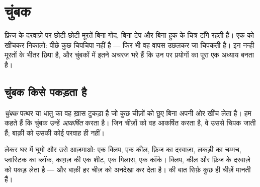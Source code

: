 \chapter{चुंबक}\label{ch:g1:magnets}

फ़्रिज के दरवाज़े पर छोटी-छोटी मूरतें बिना गोंद, बिना टेप और बिना
हुक के चित्र टाँगे रहती हैं। एक को खींचकर निकालो: पीछे कुछ चिपचिपा
नहीं है --- फिर भी वह वापस उछलकर जा चिपकती है। इन नन्ही मूरतों के
भीतर  छिपा है, और चुंबकों में इतने अचरज भरे हैं कि उन पर प्रयोगों
का पूरा एक अध्याय बनता है।

\section{चुंबक किसे पकड़ता है}

\begin{definition}[चुंबक]\label{def:g1:magnets:magnet}
\emph{चुंबक} पत्थर या धातु का वह ख़ास टुकड़ा है जो कुछ
चीज़ों को छुए बिना अपनी ओर खींच लेता है। हम कहते हैं कि चुंबक उन्हें
\emph{आकर्षित} करता है। जिन चीज़ों को वह आकर्षित करता
है, वे उससे चिपक जाती हैं; बाक़ी को उसकी कोई परवाह ही नहीं।
\end{definition}

\begin{example}\label{ex:g1:magnets:test}
 लेकर घर में घूमो और उसे आज़माओ: एक क्लिप, एक कील, फ़्रिज का
दरवाज़ा, लकड़ी का चम्मच, प्लास्टिक का ब्लॉक, काग़ज़ की एक शीट, एक
गिलास, एक कॉर्क।  क्लिप, कील और फ़्रिज के दरवाज़े को पकड़ लेता
है --- और बाक़ी हर चीज़ को अनदेखा कर देता है।  की बात सिर्फ़ कुछ
ही चीज़ें मानती हैं।
\end{example}

